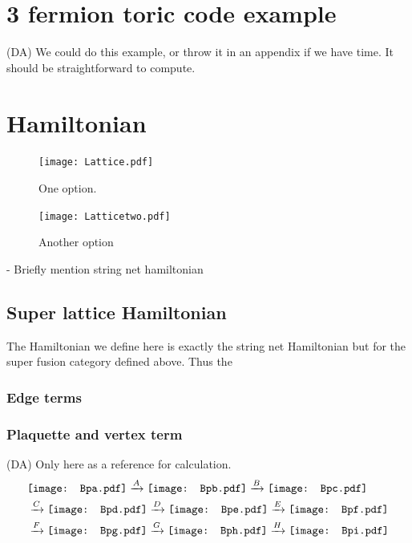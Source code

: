 \documentclass[12pt,a4paper]{article}
\newcounter{arrow}
\newcommand{\tp}{\otimes}
\newcommand{\dave}[1]{{\color{ao(english)}\footnotesize{(DA) #1}}}
\newcommand{\Bpa}{\mathord{\vcenter{\hbox{\texttt{[image: Bpa.pdf]}}}}}
\newcommand{\Bpb}{\mathord{\vcenter{\hbox{\texttt{[image: Bpb.pdf]}}}}}
\newcommand{\Bpc}{\mathord{\vcenter{\hbox{\texttt{[image: Bpc.pdf]}}}}}
\newcommand{\Bpd}{\mathord{\vcenter{\hbox{\texttt{[image: Bpd.pdf]}}}}}
\newcommand{\Bpe}{\mathord{\vcenter{\hbox{\texttt{[image: Bpe.pdf]}}}}}
\newcommand{\Bpf}{\mathord{\vcenter{\hbox{\texttt{[image: Bpf.pdf]}}}}}
\newcommand{\Bpg}{\mathord{\vcenter{\hbox{\texttt{[image: Bpg.pdf]}}}}}
\newcommand{\Bph}{\mathord{\vcenter{\hbox{\texttt{[image: Bph.pdf]}}}}}
\newcommand{\Bpi}{\mathord{\vcenter{\hbox{\texttt{[image: Bpi.pdf]}}}}}
\begin{document}
\section{3 fermion toric code example}
\dave{We could do this example, or throw it in an appendix if we have time. It should be straightforward to compute. }


 \section{Hamiltonian} 
 \begin{figure}
 \texttt{[image: Lattice.pdf]}
 \caption{One option.}
 \end{figure}
 
  \begin{figure}
 \texttt{[image: Latticetwo.pdf]}
 \caption{Another option}
 \end{figure}
  
 - Briefly mention string net hamiltonian

 \subsection{Super lattice Hamiltonian}
The Hamiltonian we define here is exactly the string net Hamiltonian but for the super fusion category defined above. 
Thus the 
\subsubsection{Edge terms}
\subsubsection{Plaquette and vertex term}
\dave{Only here as a reference for calculation.}
\begin{align}
&\Bpa \xrightarrow{A} \Bpb \xrightarrow{B} \Bpc \\
&\xrightarrow{C}\Bpd  \xrightarrow{D} \Bpe \xrightarrow{E}\Bpf \\
&\xrightarrow{F} \Bpg \xrightarrow{G} \Bph \xrightarrow{H}   \Bpi
\end{align}
 
\end{document}
